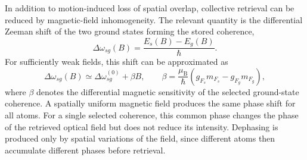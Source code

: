 In addition to motion-induced loss of spatial overlap, collective retrieval can be reduced by magnetic-field inhomogeneity. The relevant quantity is the differential Zeeman shift of the two ground states forming the stored coherence,
\begin{equation}
\Delta\omega_{sg}(B)
=
\frac{E_s(B)-E_g(B)}{\hbar}.
\end{equation}
For sufficiently weak fields, this shift can be approximated as
\begin{equation}
\Delta\omega_{sg}(B)
\simeq
\Delta\omega_{sg}^{(0)}
+
\beta B,
\qquad
\beta
=
\frac{\mu_{\mathrm B}}{\hbar}
\left(
g_{F_s}m_{F_s}
-
g_{F_g}m_{F_g}
\right),
\label{eq:results_zeeman_sensitivity}
\end{equation}
where $\beta$ denotes the differential magnetic sensitivity of the selected ground-state coherence. A spatially uniform magnetic field produces the same phase shift for all atoms. For a single selected coherence, this common phase changes the phase of the retrieved optical field but does not reduce its intensity. Dephasing is produced only by spatial variations of the field, since different atoms then accumulate different phases before retrieval.

